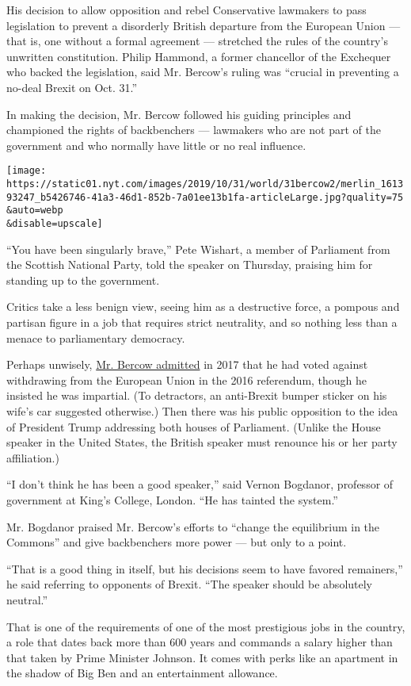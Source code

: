 His decision to allow opposition and rebel Conservative lawmakers to
pass legislation to prevent a disorderly British departure from the
European Union --- that is, one without a formal agreement --- stretched
the rules of the country's unwritten constitution. Philip Hammond, a
former chancellor of the Exchequer who backed the legislation, said Mr.
Bercow's ruling was ``crucial in preventing a no-deal Brexit on Oct.
31.''

In making the decision, Mr. Bercow followed his guiding principles and
championed the rights of backbenchers --- lawmakers who are not part of
the government and who normally have little or no real influence.

\texttt{[image: https://static01.nyt.com/images/2019/10/31/world/31bercow2/merlin\_161393247\_b5426746-41a3-46d1-852b-7a01ee13b1fa-articleLarge.jpg?quality=75\\\&auto=webp\\\&disable=upscale]}

``You have been singularly brave,'' Pete Wishart, a member of Parliament
from the Scottish National Party, told the speaker on Thursday, praising
him for standing up to the government.

Critics take a less benign view, seeing him as a destructive force, a
pompous and partisan figure in a job that requires strict neutrality,
and so nothing less than a menace to parliamentary democracy.

Perhaps unwisely,
\href{https://www.bbc.com/news/uk-politics-38947257}{Mr. Bercow
admitted} in 2017 that he had voted against withdrawing from the
European Union in the 2016 referendum, though he insisted he was
impartial. (To detractors, an anti-Brexit bumper sticker on his wife's
car suggested otherwise.) Then there was his public opposition to the
idea of President Trump addressing both houses of Parliament. (Unlike
the House speaker in the United States, the British speaker must
renounce his or her party affiliation.)

``I don't think he has been a good speaker,'' said Vernon Bogdanor,
professor of government at King's College, London. ``He has tainted the
system.''

Mr. Bogdanor praised Mr. Bercow's efforts to ``change the equilibrium in
the Commons'' and give backbenchers more power --- but only to a point.

``That is a good thing in itself, but his decisions seem to have favored
remainers,'' he said referring to opponents of Brexit. ``The speaker
should be absolutely neutral.''

That is one of the requirements of one of the most prestigious jobs in
the country, a role that dates back more than 600 years and commands a
salary higher than that taken by Prime Minister Johnson. It comes with
perks like an apartment in the shadow of Big Ben and an entertainment
allowance.

